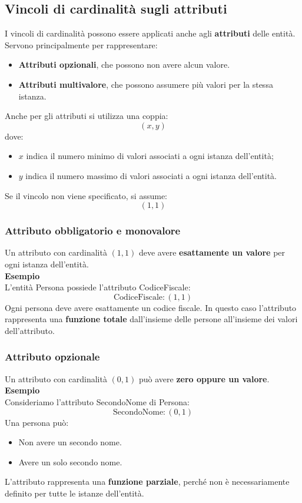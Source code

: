 \subsection{Vincoli di cardinalità sugli attributi}

I vincoli di cardinalità possono essere applicati
anche agli \textbf{attributi} delle entità.\\
Servono principalmente per rappresentare:
\begin{itemize}
    \item \textbf{Attributi opzionali}, che possono
    non avere alcun valore.
    \item \textbf{Attributi multivalore}, che possono
    assumere più valori per la stessa istanza.
\end{itemize}
\noindent
Anche per gli attributi si utilizza una coppia:
\[
\boxed{(x,y)}
\]
dove:
\begin{itemize}
    \item $x$ indica il numero minimo di valori
    associati a ogni istanza dell'entità;
    \item $y$ indica il numero massimo di valori
    associati a ogni istanza dell'entità.
\end{itemize}
\noindent
Se il vincolo non viene specificato, si assume:
\[
\boxed{(1,1)}
\]
\subsubsection*{Attributo obbligatorio e monovalore}
Un attributo con cardinalità $(1,1)$
deve avere \textbf{esattamente un valore}
per ogni istanza dell'entità.\\
\textcolor{verdeEsempio}{\textbf{Esempio}}\\
L'entità Persona possiede l'attributo CodiceFiscale:
\[
\text{CodiceFiscale}:(1,1)
\]
Ogni persona deve avere esattamente un codice fiscale.
In questo caso l'attributo rappresenta una
\textbf{funzione totale} dall'insieme delle persone
all'insieme dei valori dell'attributo.
\subsubsection*{Attributo opzionale}
Un attributo con cardinalità $(0,1)$
può avere \textbf{zero oppure un valore}.\\
\textcolor{verdeEsempio}{\textbf{Esempio}}\\
Consideriamo l'attributo SecondoNome di Persona:
\[
\text{SecondoNome}:(0,1)
\]
Una persona può:
\begin{itemize}
    \item Non avere un secondo nome.
    \item Avere un solo secondo nome.
\end{itemize}
\noindent
L'attributo rappresenta una \textbf{funzione parziale},
perché non è necessariamente definito
per tutte le istanze dell'entità.
